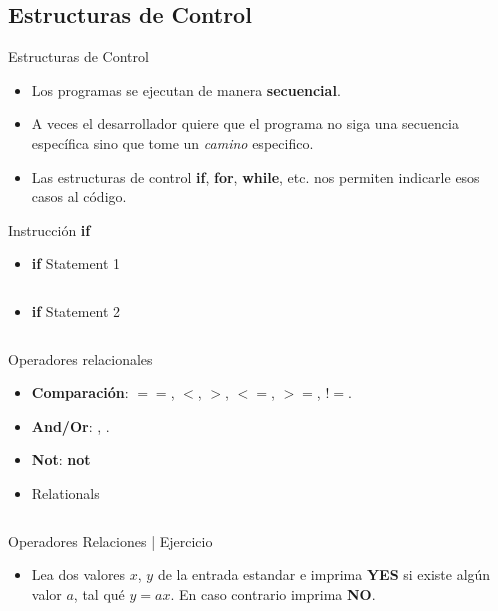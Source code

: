 \documentclass[usenames, dvipsnames, compress]{beamer}
\begin{document}
	\subsection{Estructuras de Control}
	\begin{frame}{Estructuras de Control}
		\begin{itemize}[<+- | alert@ +>]{}
			\item Los programas se ejecutan de manera \textbf{secuencial}.
			\item A veces el desarrollador quiere que el programa no siga una secuencia específica sino que tome un \textit{camino} especifico.
			\item Las estructuras de control \textbf{if}, \textbf{for}, \textbf{while}, etc. nos permiten indicarle esos casos al código. 
		\end{itemize}
	\end{frame}
	\begin{frame}[allowframebreaks]{Instrucción \textbf{if}}
	\begin{itemize}
		\item [] \begin{block}{\textbf{if} Statement 1}
			\inputminted[xleftmargin=\parindent,linenos]{python}{codes/if_statement.m}
		\end{block}
		\pause
		\item [] \begin{block}{\textbf{if} Statement 2}
			\inputminted[xleftmargin=\parindent,linenos]{python}{codes/if_statement2.m}
		\end{block}
	\end{itemize}
	\end{frame}
	\begin{frame}{Operadores relacionales}
	\begin{itemize}
		\item \textbf{Comparación}: $==$, $<$, $>$, $<=$, $>=$, $!=$.
		\pause
		\item \textbf{And/Or}: , .
		\pause
		\item \textbf{Not}: \textbf{not}
		\pause
		\item [] \begin{block}{Relationals}
			\inputminted[xleftmargin=\parindent,linenos]{python}{codes/relational.m}
		\end{block}
	\end{itemize}
	\end{frame}
	\begin{frame}{Operadores Relaciones | Ejercicio}
		\begin{itemize}
		\item Lea dos valores $x$, $y$ de la entrada estandar e imprima \textbf{YES} si existe algún valor $a$, tal qué $y = ax$. En caso contrario imprima \textbf{NO}.
		\end{itemize}
	\end{frame}
\end{document}

